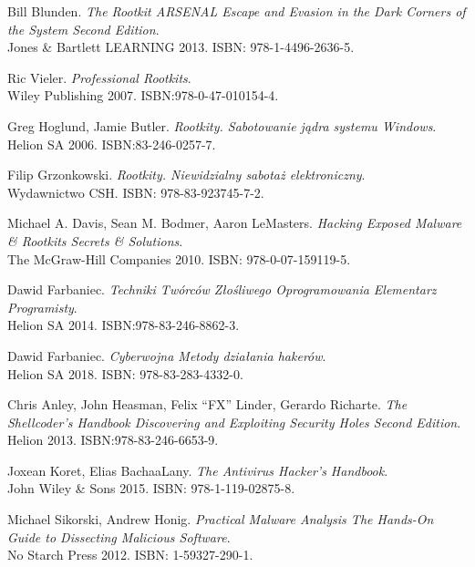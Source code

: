 \begin{thebibliography}{9}



Bill Blunden.
\textit{The Rootkit ARSENAL Escape and Evasion in the Dark Corners of the System Second Edition}.
\\ Jones \& Bartlett LEARNING 2013. ISBN: 978-1-4496-2636-5.

Ric Vieler. 
\textit{Professional Rootkits}. 
\\ Wiley Publishing 2007. ISBN:978-0-47-010154-4.

Greg Hoglund, Jamie Butler. 
\textit{Rootkity. Sabotowanie jądra systemu Windows}. 
\\Helion SA 2006. ISBN:83-246-0257-7.

Filip Grzonkowski. 
\textit{Rootkity. Niewidzialny sabotaż elektroniczny}. 
\\ Wydawnictwo CSH. ISBN: 978-83-923745-7-2.


Michael A. Davis, Sean M. Bodmer, Aaron LeMasters.
\textit{Hacking Exposed Malware \& Rootkits Secrets \& Solutions}. 
\\ The McGraw-Hill Companies 2010. ISBN: 978-0-07-159119-5.


Dawid Farbaniec. 
\textit{Techniki Twórców Złośliwego Oprogramowania Elementarz Programisty}. 
\\ Helion SA 2014. ISBN:978-83-246-8862-3.

Dawid Farbaniec. 
\textit{Cyberwojna Metody działania hakerów}. 
\\ Helion SA 2018. ISBN: 978-83-283-4332-0.

Chris Anley, John Heasman, Felix “FX” Linder, Gerardo Richarte. 
\textit{The Shellcoder’s Handbook Discovering and Exploiting Security Holes Second Edition}. 
\\ Helion 2013. ISBN:978-83-246-6653-9.


Joxean Koret, Elias BachaaLany. 
\textit{The Antivirus Hacker’s Handbook}. 
\\ John Wiley \& Sons 2015. ISBN: 978-1-119-02875-8.



Michael Sikorski, Andrew Honig. 
\textit{Practical Malware Analysis The Hands-On Guide to Dissecting Malicious Software}. 
\\No Starch Press  2012.  ISBN: 1-59327-290-1.



\end{thebibliography}
